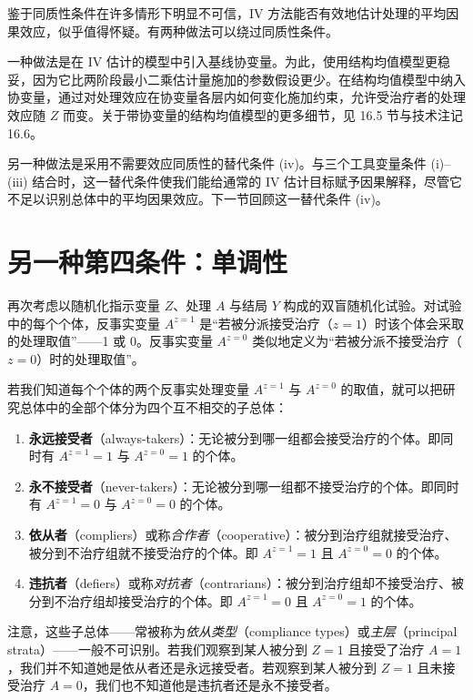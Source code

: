 鉴于同质性条件在许多情形下明显不可信，IV 方法能否有效地估计处理的平均因果效应，似乎值得怀疑。有两种做法可以绕过同质性条件。

一种做法是在 IV 估计的模型中引入基线协变量。为此，使用结构均值模型更稳妥，因为它比两阶段最小二乘估计量施加的参数假设更少。在结构均值模型中纳入协变量，通过对处理效应在协变量各层内如何变化施加约束，允许受治疗者的处理效应随 $Z$ 而变。关于带协变量的结构均值模型的更多细节，见 16.5 节与技术注记 16.6。

另一种做法是采用不需要效应同质性的替代条件 (iv)。与三个工具变量条件 (i)–(iii) 结合时，这一替代条件使我们能给通常的 IV 估计目标赋予因果解释，尽管它不足以识别总体中的平均因果效应。下一节回顾这一替代条件 (iv)。

\section{另一种第四条件：单调性}

再次考虑以随机化指示变量 $Z$、处理 $A$ 与结局 $Y$ 构成的双盲随机化试验。对试验中的每个个体，反事实变量 $A^{z=1}$ 是“若被分派接受治疗（$z=1$）时该个体会采取的处理取值”——1 或 0。反事实变量 $A^{z=0}$ 类似地定义为“若被分派不接受治疗（$z=0$）时的处理取值”。

若我们知道每个个体的两个反事实处理变量 $A^{z=1}$ 与 $A^{z=0}$ 的取值，就可以把研究总体中的全部个体分为四个互不相交的子总体：

\begin{enumerate}[leftmargin=1.9em,itemsep=0.4em,topsep=0.3em]
\item \textbf{永远接受者}（always-takers）：无论被分到哪一组都会接受治疗的个体。即同时有 $A^{z=1}=1$ 与 $A^{z=0}=1$ 的个体。

\item \textbf{永不接受者}（never-takers）：无论被分到哪一组都不接受治疗的个体。即同时有 $A^{z=1}=0$ 与 $A^{z=0}=0$ 的个体。

\item \textbf{依从者}（compliers）或称\emph{合作者}（cooperative）：被分到治疗组就接受治疗、被分到不治疗组就不接受治疗的个体。即 $A^{z=1}=1$ 且 $A^{z=0}=0$ 的个体。

\item \textbf{违抗者}（defiers）或称\emph{对抗者}（contrarians）：被分到治疗组却不接受治疗、被分到不治疗组却接受治疗的个体。即 $A^{z=1}=0$ 且 $A^{z=0}=1$ 的个体。
\end{enumerate}

注意，这些子总体——常被称为\emph{依从类型}（compliance types）或\emph{主层}（principal strata）——一般不可识别。若我们观察到某人被分到 $Z=1$ 且接受了治疗 $A=1$，我们并不知道她是依从者还是永远接受者。若观察到某人被分到 $Z=1$ 且未接受治疗 $A=0$，我们也不知道他是违抗者还是永不接受者。

